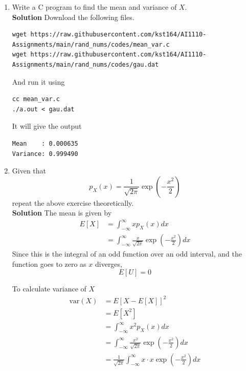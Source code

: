 \documentclass[journal, 12pt, twocolumn]{IEEEtran}
\begin{document}
\begin{enumerate}[label=\arabic{section}.\arabic*]
    \item
        Write a C program to find the mean and variance of $X$.
        \\
        \textbf{Solution} Download the following files.
        \begin{lstlisting}
wget https://raw.githubusercontent.com/kst164/AI1110-Assignments/main/rand_nums/codes/mean_var.c
wget https://raw.githubusercontent.com/kst164/AI1110-Assignments/main/rand_nums/codes/gau.dat
        \end{lstlisting}
        And run it using
        \begin{lstlisting}
cc mean_var.c
./a.out < gau.dat
        \end{lstlisting}
        It will give the output
        \begin{lstlisting}
Mean    : 0.000635
Variance: 0.999490
        \end{lstlisting}

    \item
        Given that
        \begin{equation}
            p_X(x) = \frac{1}{\sqrt{2 \pi}} \exp \left(-\frac{x^2}{2}\right)
        \end{equation}
        repeat the above exercise theoretically.
        \\
        \textbf{Solution}
        The mean is given by
        \begin{align}
            E\left[X\right] &= \int_{-\infty}^{\infty}{x p_X(x) dx} \\
            &= \int_{-\infty}^{\infty}{\frac{x}{\sqrt{2 \pi}} \exp\left(-\frac{x^2}{2}\right) dx}
        \end{align}
        Since this is the integral of an odd function over an odd interval, and the function goes to zero as $x$ diverges,
        \begin{equation}
            E\left[U\right] = 0
        \end{equation}

        To calculate variance of $X$
        \begin{align}
            \text{var}(X) &= E\left[X - E[X]\right]^2 \\
            &= E\left[X^2\right] \\
            &= \int_{-\infty}^{\infty}{x^2 p_X(x) dx} \\
            &= \int_{-\infty}^{\infty}{\frac{x^2}{\sqrt{2 \pi}} \exp\left(-\frac{x^2}{2}\right) dx} \\
            &= \frac{1}{\sqrt{2 \pi}} \int_{-\infty}^{\infty}{x \cdot x \exp\left(-\frac{x^2}{2}\right) dx}
        \end{align}


\end{enumerate}
\end{document}
